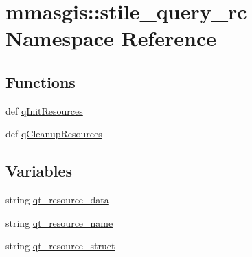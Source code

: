 \hypertarget{namespacemmasgis_1_1stile__query__rc}{
\section{mmasgis::stile\_\-query\_\-rc Namespace Reference}
\label{namespacemmasgis_1_1stile__query__rc}
}
\subsection*{Functions}
\begin{DoxyCompactItemize}
\item 
def \hyperlink{namespacemmasgis_1_1stile__query__rc_a8359a71c698fc1132b4f3b59726b3dc6}{qInitResources}
\item 
def \hyperlink{namespacemmasgis_1_1stile__query__rc_a2403e7da48616755ae2e28d8816fb0cd}{qCleanupResources}
\end{DoxyCompactItemize}
\subsection*{Variables}
\begin{DoxyCompactItemize}
\item 
string \hyperlink{namespacemmasgis_1_1stile__query__rc_a4e66f6f457af6fcc7a77a4b1243355c7}{qt\_\-resource\_\-data}
\item 
string \hyperlink{namespacemmasgis_1_1stile__query__rc_a8c0542b9a31e7aab2521f9f05ff464bc}{qt\_\-resource\_\-name}
\item 
string \hyperlink{namespacemmasgis_1_1stile__query__rc_a87a77006d6ff866f8821d98eaf2a7253}{qt\_\-resource\_\-struct}
\end{DoxyCompactItemize}


